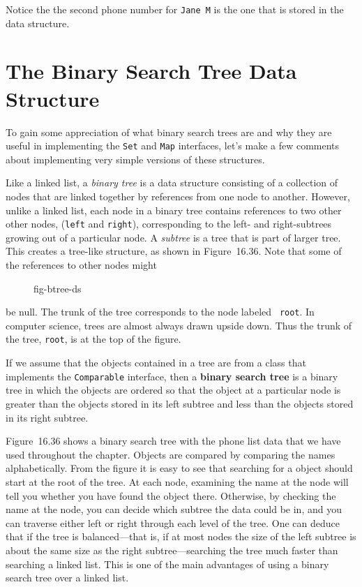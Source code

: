 \noindent Notice the the second phone number for {\tt Jane M} is the one that
is stored in the data structure.

\section{ The Binary Search Tree Data Structure}

To gain some appreciation of what binary search trees are and why they
are useful in implementing the {\tt Set} and {\tt Map} interfaces, let's
make a few comments about implementing very simple versions of these 
structures.

Like a linked list, a {\em binary tree} is a data structure consisting
of a collection of nodes that are linked together by references from
one node to another.  However, unlike a linked list, each node in a
binary tree contains references to two other other nodes, ({\tt left}
and {\tt right}), corresponding to the left- and right-subtrees
growing out of a particular node.  A {\em subtree} is a tree that is
part of larger tree. This creates a tree-like structure, as shown in
Figure~16.36. Note that some of the references to other nodes might
\begin{figure}[h!]
 {fig-btree-ds}
\end{figure}
\noindent be null.  The trunk of the tree corresponds to the node labeled {\tt
root}. In computer science, trees are almost always drawn upside down.
Thus the trunk of the tree, {\tt root}, is at the top of the figure.

If we assume that the objects contained in a tree are from a class
that implements the {\tt Comparable} interface, then a {\bf binary
search tree} is a binary tree in which the objects are ordered so that
the object at a particular node is greater than the objects stored in
its left subtree and less than the objects stored in its right
subtree.

Figure~16.36 shows a binary search tree with the phone list data that
we have used throughout the chapter.  Objects are compared by
comparing the names alphabetically.  From the figure it is easy to see
that searching for a object should start at the root of the tree. At
each node, examining the name at the node will tell you whether you
have found the object there.  Otherwise, by checking the name at the
node, you can decide which subtree the data could be in, and you can
traverse either left or right through each level of the tree. One can
deduce that if the tree is balanced---that is, if at most nodes the
size of the left subtree is about the same size as the right
subtree---searching the tree much faster than searching a linked
list. This is one of the main advantages of using a binary search tree
over a linked list.  

